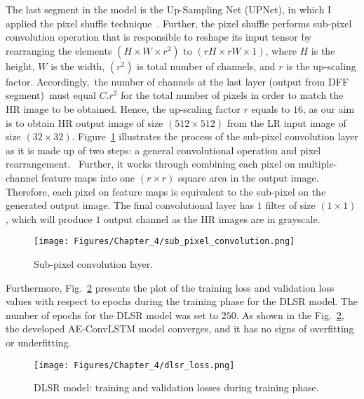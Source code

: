 The last segment in the model is the Up-Sampling Net (UPNet), in which I applied the pixel shuffle technique~\cite{Shi2016}.
Further, the pixel shuffle performs sub-pixel convolution operation that is responsible to reshape its input tensor by rearranging the elements \((H\times W\times r^2)\) to \((rH\times rW\times 1)\), where \(H\) is the height, \(W\) is the width, \((r^2)\) is total number of channels, and \(r\) is the up-scaling factor.
Accordingly, the number of channels at the last layer (output from DFF segment) must equal \(C.r^2\) for the total number of pixels in order to match the HR image to be obtained.
Hence, the up-scaling factor \(r\) equals to \(16\), as our aim is to obtain HR output image of size \((512\times 512)\) from the LR input image of size \((32\times 32)\).
Figure~\ref{fig:sub_pixel_layer} illustrates the process of the sub-pixel convolution layer as it is made up of two steps: a general convolutional operation and pixel rearrangement. 
Further, it works through combining each pixel on multiple-channel feature maps into one \((r\times r)\) square area in the output image. 
Therefore, each pixel on feature maps is equivalent to the sub-pixel on the generated output image.
The final convolutional layer has \(1\) filter of size \((1\times 1)\), which will produce \(1\) output channel as the HR images are in grayscale. 
\begin{figure} [h!]
	\begin{center}
		\texttt{[image: Figures/Chapter\_4/sub\_pixel\_convolution.png]}
	\end{center}
	\caption{Sub-pixel convolution layer.} 
	\label{fig:sub_pixel_layer}
\end{figure}


Furthermore, Fig.~\ref{fig:dlsr_loss} presents the plot of the training loss and validation loss values with respect to epochs during the training phase for the DLSR model.
The number of epochs for the DLSR model was set to $250$.
As shown in the Fig.~\ref{fig:dlsr_loss}, the developed AE-ConvLSTM model converges, and it has no signs of overfitting or underfitting.
\begin{figure} [h!]
	\begin{center}
		\texttt{[image: Figures/Chapter\_4/dlsr\_loss.png]}
	\end{center}
	\caption{DLSR model: training and validation losses during training phase.} 
	\label{fig:dlsr_loss}
\end{figure}
